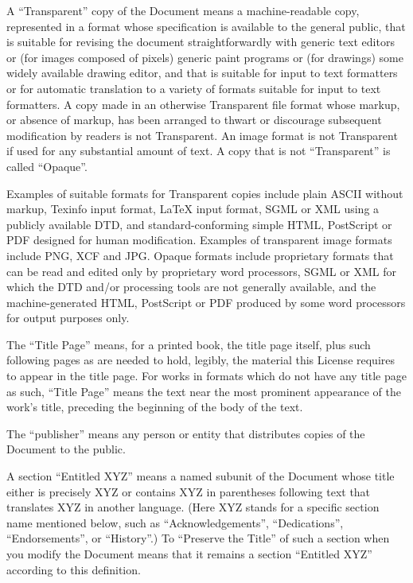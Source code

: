 \documentclass[10pt,]{book}
\theoremstyle{plain}
\theoremstyle{definition}
\theoremstyle{definition}
\numberwithin{equation}{chapter}
\begin{document}
\begin{footnotesize}
\par
\hypertarget{p-2245}{}%
A ``Transparent'' copy of the Document means a machine-readable copy, represented in a format whose specification is available to the general public, that is suitable for revising the document straightforwardly with generic text editors or (for images composed of pixels) generic paint programs or (for drawings) some widely available drawing editor, and that is suitable for input to text formatters or for automatic translation to a variety of formats suitable for input to text formatters. A copy made in an otherwise Transparent file format whose markup, or absence of markup, has been arranged to thwart or discourage subsequent modification by readers is not Transparent. An image format is not Transparent if used for any substantial amount of text. A copy that is not ``Transparent'' is called ``Opaque''.%
\par
\hypertarget{p-2246}{}%
Examples of suitable formats for Transparent copies include plain ASCII without markup, Texinfo input format, LaTeX input format, SGML or XML using a publicly available DTD, and standard-conforming simple HTML, PostScript or PDF designed for human modification. Examples of transparent image formats include PNG, XCF and JPG. Opaque formats include proprietary formats that can be read and edited only by proprietary word processors, SGML or XML for which the DTD and/or processing tools are not generally available, and the machine-generated HTML, PostScript or PDF produced by some word processors for output purposes only.%
\par
\hypertarget{p-2247}{}%
The ``Title Page'' means, for a printed book, the title page itself, plus such following pages as are needed to hold, legibly, the material this License requires to appear in the title page. For works in formats which do not have any title page as such, ``Title Page'' means the text near the most prominent appearance of the work's title, preceding the beginning of the body of the text.%
\par
\hypertarget{p-2248}{}%
The ``publisher'' means any person or entity that distributes copies of the Document to the public.%
\par
\hypertarget{p-2249}{}%
A section ``Entitled XYZ'' means a named subunit of the Document whose title either is precisely XYZ or contains XYZ in parentheses following text that translates XYZ in another language. (Here XYZ stands for a specific section name mentioned below, such as ``Acknowledgements'', ``Dedications'', ``Endorsements'', or ``History''.) To ``Preserve the Title'' of such a section when you modify the Document means that it remains a section ``Entitled XYZ'' according to this definition.%

\end{footnotesize}
\end{document}
